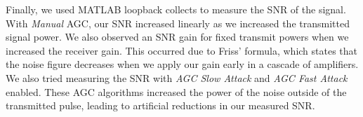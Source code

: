 \documentclass{article}
\begin{document}
Finally, we used MATLAB loopback collects to measure the SNR of the signal. With \textit{Manual} AGC, our SNR increased linearly as we increased the transmitted signal power. We also observed an SNR gain for fixed transmit powers when we increased the receiver gain. This occurred due to Friss' formula, which states that the noise figure decreases when we apply our gain early in a cascade of amplifiers. We also tried measuring the SNR with \textit{AGC Slow Attack} and \textit{AGC Fast Attack} enabled. These AGC algorithms increased the power of the noise outside of the transmitted pulse, leading to artificial reductions in our measured SNR.

\nocite{analog_devices_libiio_error}

{}
%
	
\end{document}
